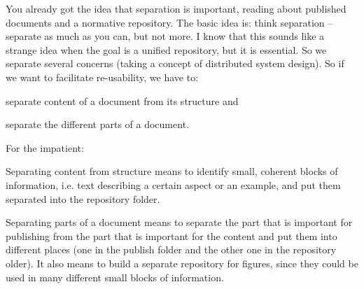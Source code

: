 
You already got the idea that separation is important, reading about published documents and
a normative repository. The basic idea is: think separation -- separate as much as you can, but
not more. I know that this sounds like a strange idea when the goal is a unified repository, but it is 
essential. So we separate several concerns (taking a concept of distributed system design). So if we
want to facilitate re-usability, we have to:
\begin{skbnoteenum}
  \item separate content of a document from its structure and
  \item separate the different parts of a document.
\end{skbnoteenum}

\noindent For the impatient:
\begin{skbnoteenum}
  \item Separating content from structure means to identify small, coherent blocks of information, i.e.
        text describing a certain aspect or an example, and put them separated into the repository folder.
  \item Separating parts of a document means to separate the part that is important for publishing from 
        the part that is important for the content and put them into different places (one in the publish
        folder and the other one in the repository older). It also means to build a separate repository 
        for figures, since they could be used in many different small blocks of information.
\end{skbnoteenum}